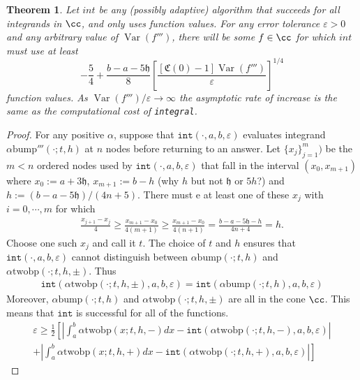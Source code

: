 \documentclass{iitthesis}
\DeclareMathOperator{\Var}{Var}
\newtheorem{theorem}{Theorem}
\theoremstyle{definition}
\theoremstyle{remark}
\begin{document}
\begin{theorem}\label{lowbndcost}
    Let $int$ be any (possibly adaptive) algorithm that succeeds for all integrands in $\cc$, and only uses function values. For any error tolerance $\varepsilon > 0$ and any arbitrary value of $\Var(f''')$, there will be some $f\in \cc$ for which $int$ must use at least
    \begin{equation}\label{lowbndcostineq}
        -\frac{5}{4}+\frac{b-a-5\mathfrak{h}}{8}\left[\frac{[\mathfrak{C}(0)-1]\Var( f''')}{\varepsilon}\right]^{1/4}
    \end{equation}
    function values. As $\Var(f''')/\varepsilon \rightarrow \infty$ the asymptotic rate of increase is the same as the computational cost of \texttt{integral}.
\end{theorem}
\begin{proof}
  For any positive $\alpha$, suppose that $\texttt{int}(\cdot,a,b,\varepsilon)$ evaluates integrand $\alpha\text{bump}'''(\cdot;t,h)$ at $n$ nodes before returning to an answer. Let $\{x_j\}_{j=1}^{m})$ be the $m<n$ ordered nodes used by $\texttt{int}(\cdot,a,b,\varepsilon)$ that fall in the interval $(x_{0},x_{m+1})$ where $x_{0}:=a+3\mathfrak{h}$, $x_{m+1}:=b-h$ (why $h$ but not $\mathfrak{h}$ or $5h$?) and $h:=(b-a-5\mathfrak{h})/(4n+5)$. There must e at least one of these $x_{j}$ with $i=0,\cdots,m$ for which
  \begin{align*}
    \frac{x_{j+1}-x_{j}}{4}\ge\frac{x_{m+1}-x_{0}}{4(m+1)}\ge\frac{x_{m+1}-x_{0}}{4(n+1)}=\frac{b-a-5\mathfrak{h}-h}{4n+4}=h.
  \end{align*}
  Choose one such $x_{j}$ and call it $t$. The choice of $t$ and $h$ ensures that $\texttt{int}(\cdot,a,b,\varepsilon)$ cannot distinguish between $\alpha\text{bump}(\cdot;t,h)$ and $\alpha\text{twobp}(\cdot;t,h,\pm)$. Thus
  \begin{align*}
    \texttt{int}(\alpha\text{twobp}(\cdot;t,h,\pm),a,b,\varepsilon)=\texttt{int}(\alpha\text{bump}(\cdot;t,h),a,b,\varepsilon)
  \end{align*}
  Moreover, $\alpha\text{bump}(\cdot;t,h)$ and $\alpha\text{twobp}(\cdot;t,h,\pm)$ are all in the cone $\cc$. This means that $\texttt{int}$ is successful for all of the functions.
  \begin{subequations}
  \begin{multline*}
    \varepsilon\ge\frac{1}{2}\left[\right.\left|\int_{a}^{b}\alpha\text{twobp}(x;t,h,-)dx-\texttt{int}(\alpha\text{twobp}(\cdot;t,h,-),a,b,\varepsilon)\right|\\
    +\left|\int_{a}^{b}\alpha\text{twobp}(x;t,h,+)dx-\texttt{int}(\alpha\text{twobp}(\cdot;t,h,+),a,b,\varepsilon)\right|\left.\right]

\end{multline*}
\end{subequations}
\end{proof}
\end{document}
